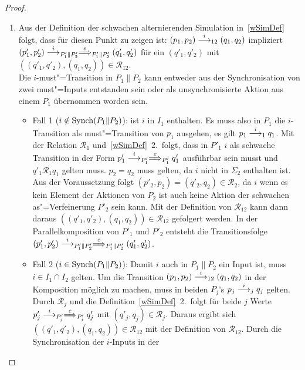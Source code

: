 \begin{proof}
\begin{enumerate}
    \item Aus der Definition der schwachen alternierenden
      Simulation in~\ref{wSimDef} folgt, dass für diesen Punkt zu zeigen ist:
      $(p_1,p_2)\must[i]_{12}(q_1,q_2)$ impliziert $(p'_1,p'_2)
      \must[i]_{P'_1\|P'_2} \weakmust[\varepsilon]_{P'_1\|P'_2} (q'_1,q'_2)$
      für ein $(q'_1,q'_2)$ mit $((q'_1,q'_2),(q_1,q_2)) \in
      \mathcal{R}_{12}$.\\
      Die $i$-must"=Transition in $P_1\|P_2$ kann entweder aus der
      Synchronisation von zwei must"=Inputs entstanden sein oder als
      unsynchronisierte Aktion aus einem $P_1$ übernommen worden sein.
      \begin{itemize}
        \item Fall 1 ($i\notin\mathrm{Synch} (P_1\|P_2)$): \OBdA{} ist $i$ in $I_1$
          enthalten. Es muss also in $P_1$ die $i$-Transition als
          must"=Transition von $p_1$ ausgehen, es gilt $p_1\must[i]_1 q_1$. Mit
          der Relation $\mathcal{R}_1$ und~\ref{wSimDef}~2.\ folgt, dass in
          $P'_1$ $i$ als schwache Transition in der Form $p'_1\must[i]_{P'_1}
          \weakmust[\varepsilon]_{P'_1}q'_1$ ausführbar sein musst und $q'_1
          \mathcal{R}_1q_1$ gelten muss. $p_2=q_2$ muss gelten, da $i$ nicht in
          $\Sigma _2$ enthalten ist. Aus der Voraussetzung folgt $(p'_2,p_2) =
          (q'_2,q_2) \in \mathcal{R}_2$, da $i$ wenn es kein Element der
          Aktionen von $P_2$ ist auch keine Aktion der schwachen
          as"=Verfeinerung $P'_2$ sein kann. Mit der Definition von
          $\mathcal{R}_{12}$ kann dann daraus $((q'_1,q'_2),(q_1,q_2)) \in
          \mathcal{R}_{12}$ gefolgert werden. In der Parallelkomposition von
          $P'_1$ und $P'_2$ entsteht die Transitionsfolge
          $(p'_1,p'_2)\must[i]_{P'_1\|P'_2} \weakmust[\varepsilon]_{P'_1\|P'_2}
          (q'_1,q'_2)$.
        \item Fall 2 ($i\in\mathrm{Synch} (P_1\|P_2)$): Damit $i$ auch in $P_1\|P_2$
          ein Input ist, muss $i\in I_1\cap I_2$ gelten. Um die Transition
          $(p_1,p_2)\must[i]_{12}(q_1,q_2)$ in der Komposition möglich zu
          machen, muss in beiden $P_j$'s $p_j\must[i]_j q_j$ gelten. Durch
          $\mathcal{R}_j$ und die Definition~\ref{wSimDef}~2.\ folgt für beide
          $j$ Werte $p'_j\must[i]_{P'_j} \weakmust[\varepsilon]_{P'_j}q'_j$ mit
          $(q'_j,q_j)\in\mathcal{R}_j$. Daraus ergibt sich
          $((q'_1,q'_2),(q_1,q_2)) \in \mathcal{R}_{12}$ mit der Definition von
          $\mathcal{R}_{12}$. Durch die Synchronisation der $i$-Inputs in der

\end{itemize}
\end{enumerate}
\end{proof}
